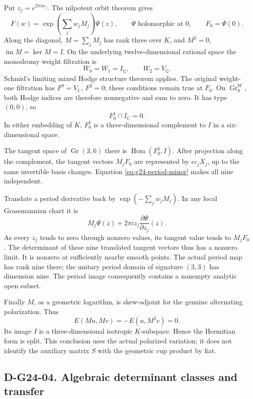 Put \(z_j=e^{2\pi i w_j}\).  The nilpotent orbit theorem
\cite[Theorem 4.12, p.~233]{G34:Schmid} gives
\[
 F(w)=\exp\!\left(\sum_jw_jM_j\right)\Psi(z),
 \qquad\Psi\text{ holomorphic at }0,
 \qquad F_0=\Psi(0).
\]
Along the diagonal, \(M=\sum_jM_j\) has rank three over \(K\), and
\(M^2=0\), \(\operatorname{im}M=\ker M=I\).  On the underlying
twelve-dimensional rational space the monodromy weight filtration is
\[
                    W_0=W_1=I_{\mathbb Q},\qquad W_2=V_{\mathbb Q}.
\]
Schmid's limiting mixed Hodge structure theorem
\cite[Theorem 6.16, p.~255]{G34:Schmid} applies.  The original weight-one
filtration has \(F^0=V_{\mathbb C}\), \(F^2=0\); these conditions remain
true at \(F_0\).  On \(\operatorname{Gr}_0^W\), both Hodge indices are
therefore nonnegative and sum to zero.  It has type \((0,0)\), so
\[
                            F_0^1\cap I_{\mathbb C}=0.
\]
In either embedding of \(K\), \(F_0^1\) is a three-dimensional complement
to \(I\) in a six-dimensional space.

The tangent space of \(\operatorname{Gr}(3,6)\) there is
\(\operatorname{Hom}(F_0^1,I)\).  After projection along the complement,
the tangent vectors \(M_jF_0\) are represented by \(\epsilon c_jX_j\),
up to the same invertible basis changes.  Equation
\eqref{eq:g24-period-minor} makes all nine independent.

Translate a period derivative back by
\(\exp(-\sum_jw_jM_j)\).  In any local Grassmannian chart it is
\[
              M_j\Psi(z)+2\pi i z_j\frac{\partial\Psi}{\partial z_j}(z).
\]
As every \(z_j\) tends to zero through nonzero values, its tangent value
tends to \(M_jF_0\).  The determinant of these nine translated tangent
vectors thus has a nonzero limit.  It is nonzero at sufficiently nearby
smooth points.  The actual period map has rank nine there; the unitary
period domain of signature \((3,3)\) has dimension nine.  The period
image consequently contains a nonempty analytic open subset.

Finally \(M\), as a geometric logarithm, is skew-adjoint for the genuine
alternating polarization.  Thus
\[
 E(Mu,Mv)=-E(u,M^2v)=0.
\]
Its image \(I\) is a three-dimensional isotropic \(K\)-subspace.  Hence
the Hermitian form is split.  This conclusion uses the actual polarized
variation; it does not identify the auxiliary matrix \(S\) with the
geometric cup product by fiat.

\subsection*{D-G24-04. Algebraic determinant classes and transfer}

